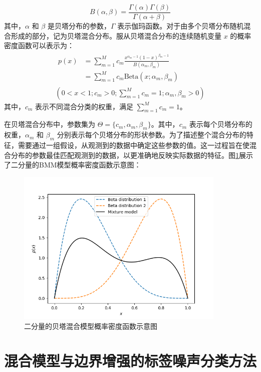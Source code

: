 \begin{equation}
    B(\alpha, \beta) = \frac{\Gamma(\alpha) \Gamma(\beta)}{\Gamma(\alpha + \beta)}
\end{equation}
其中，$\alpha$ 和 $\beta$ 是贝塔分布的参数，$\Gamma$ 表示伽玛函数。对于由多个贝塔分布随机混合形成的部分，记为贝塔混合分布。服从贝塔混合分布的连续随机变量 $x$ 的概率密度函数可以表示为：
\begin{equation}
    \label{eq:beta}
    \begin{gathered}
        \begin{aligned}
            p(x) & = \sum_{m=1}^M c_m \frac{x^{\alpha_m - 1} (1 - x)^{\beta_m - 1}}{B(\alpha_m, \beta_m)} \\
                 & = \sum_{m=1}^M c_m \text{Beta}(x; \alpha_m, \beta_m)
        \end{aligned}
        \\
        (0 < x < 1; c_m > 0; \sum_{m=1}^M c_m = 1; \alpha_m, \beta_m > 0)
    \end{gathered}
\end{equation}
其中，$c_m$ 表示不同混合分类的权重，满足 $\sum_{m=1}^M c_m=1$。

在贝塔混合分布中，参数集为 $\Theta = \{c_m, \alpha_m, \beta_m\}$。其中，$c_m$ 表示每个贝塔分布的权重，$\alpha_m$ 和 $\beta_m$ 分别表示每个贝塔分布的形状参数。为了描述整个混合分布的特征，需要通过一组假设，从观测到的数据中确定这些参数的值。这一过程旨在使混合分布的参数最佳匹配观测到的数据，以更准确地反映实际数据的特征。图\ref{BMM}展示了二分量的BMM模型概率密度函数示意图：
\begin{figure}[ht!]
    \centering
    \includegraphics[width=10cm]{pic/chapter4/BMM.png}
    \caption{二分量的贝塔混合模型概率密度函数示意图}
    \label{BMM}
\end{figure}

\section{混合模型与边界增强的标签噪声分类方法}
